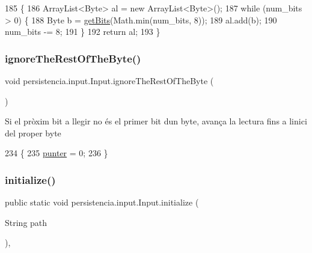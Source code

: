 \begin{DoxyCode}
185     \{
186         ArrayList<Byte> al = \textcolor{keyword}{new} ArrayList<Byte>();
187         \textcolor{keywordflow}{while} (num\_bits > 0) \{
188             Byte b = \hyperlink{classpersistencia_1_1input_1_1Input_a3fa5a378b2155a3022a4a4ef38d63a8e}{getBits}(Math.min(num\_bits, 8));
189             al.add(b);
190             num\_bits -= 8;
191         \}
192         \textcolor{keywordflow}{return} al;
193     \}
\end{DoxyCode}
\mbox{\label{classpersistencia_1_1input_1_1Input_a2b9b57fce6cb83efe70d5dc205737249}} 
\subsubsection{\texorpdfstring{ignore\+The\+Rest\+Of\+The\+Byte()}{ignoreTheRestOfTheByte()}}
{\footnotesize\ttfamily void persistencia.\+input.\+Input.\+ignore\+The\+Rest\+Of\+The\+Byte (\begin{DoxyParamCaption}{ }\end{DoxyParamCaption})\hspace{0.3cm}{\ttfamily [inline]}}

Si el pròxim bit a llegir no és el primer bit d\textquotesingle{}un byte, avança la lectura fins a l\textquotesingle{}inici del proper byte 
\begin{DoxyCode}
234                                          \{
235         \hyperlink{classpersistencia_1_1input_1_1Input_abe76388d0ac9eeafdba673ad2138f8dc}{punter} = 0;
236     \}
\end{DoxyCode}
\mbox{\label{classpersistencia_1_1input_1_1Input_abe53dec7aca98b94d0ec5e3200483513}} 
\subsubsection{\texorpdfstring{initialize()}{initialize()}}
{\footnotesize\ttfamily public static void persistencia.\+input.\+Input.\+initialize (\begin{DoxyParamCaption}\item[{String}]{path }\end{DoxyParamCaption})\hspace{0.3cm}{\ttfamily [inline]}, {\ttfamily [static]}}



